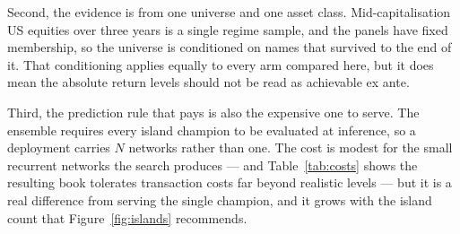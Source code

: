 Second, the evidence is from one universe and one asset class.
Mid-capitalisation US equities over three years is a single regime
sample, and the panels have fixed membership, so the universe is
conditioned on names that survived to the end of it. That conditioning
applies equally to every arm compared here, but it does mean the absolute
return levels should not be read as achievable ex ante.

Third, the prediction rule that pays is also the expensive one to serve.
The ensemble requires every island champion to be evaluated at inference,
so a deployment carries $N$ networks rather than one. The cost is modest
for the small recurrent networks the search produces --- and
Table~\ref{tab:costs} shows the resulting book tolerates transaction
costs far beyond realistic levels --- but it is a real difference from
serving the single champion, and it grows with the island count that
Figure~\ref{fig:islands} recommends.
